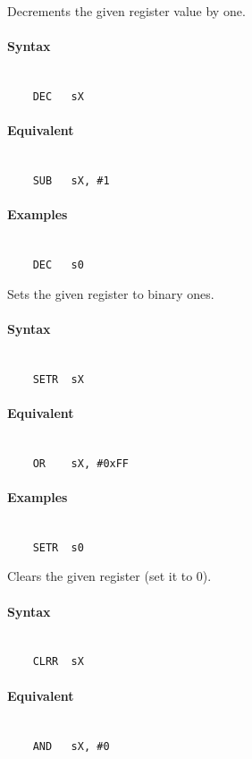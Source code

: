 \clearpage
{}
    Decrements the given register value by one.

    \paragraph{Syntax}
        ~\\
        \verb'    DEC   sX'

    \paragraph{Equivalent}
        ~\\
        \verb'    SUB   sX, #1'

    \paragraph{Examples}
        ~\\
        \verb'    DEC   s0'

    Sets the given register to binary ones.

    \paragraph{Syntax}
        ~\\
        \verb'    SETR  sX'

    \paragraph{Equivalent}
        ~\\
        \verb'    OR    sX, #0xFF'

    \paragraph{Examples}
        ~\\
        \verb'    SETR  s0'

    Clears the given register (set it to 0).

    \paragraph{Syntax}
        ~\\
        \verb'    CLRR  sX'

    \paragraph{Equivalent}
        ~\\
        \verb'    AND   sX, #0'

